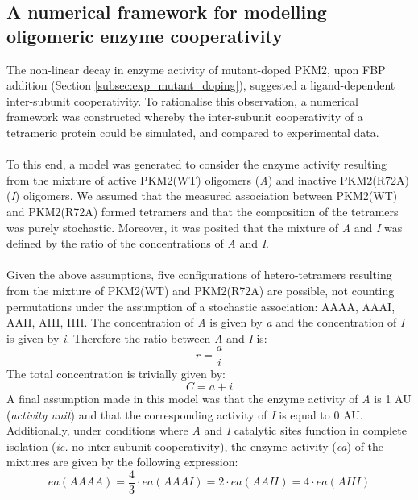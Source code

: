 \subsection{A numerical framework for modelling oligomeric enzyme cooperativity}
The non-linear decay in enzyme activity of mutant-doped PKM2, upon FBP addition (Section \ref{subsec:exp_mutant_doping}), suggested a ligand-dependent inter-subunit cooperativity. To rationalise this observation, a numerical framework was constructed whereby the inter-subunit cooperativity of a tetrameric protein could be simulated, and compared to experimental data.
%
%
\\\\
%
%
To this end, a model was generated to consider the enzyme activity resulting from the mixture of active PKM2(WT) oligomers (\textit{A}) and inactive PKM2(R72A) (\textit{I}) oligomers. We assumed that the measured association between PKM2(WT) and PKM2(R72A) formed tetramers and that the composition of the tetramers was purely stochastic. Moreover, it was posited that the mixture of \textit{A} and \textit{I} was defined by the ratio of the concentrations of \textit{A} and \textit{I}. 
%
%
\\\\
%
%
Given the above assumptions, five configurations of hetero-tetramers resulting from the mixture of PKM2(WT) and PKM2(R72A) are possible, not counting permutations under the assumption of a stochastic association: AAAA, AAAI, AAII, AIII, IIII. The concentration of \textit{A} is given by \textit{a} and the concentration of \textit{I} is given by \textit{i}. Therefore the ratio between \textit{A} and \textit{I} is:
%
\begin{equation}
r = \frac{a}{i}
\end{equation}
%
The total concentration is trivially given by:
%
\begin{equation}
C = a + i
\end{equation}
%
%
A final assumption made in this model was that the enzyme activity of \textit{A} is 1 AU (\textit{activity unit}) and that the corresponding activity of \textit{I} is equal to 0 AU. Additionally, under conditions where \textit{A} and \textit{I} catalytic sites function in complete isolation (\textit{ie.} no inter-subunit cooperativity), the enzyme activity (\textit{ea}) of the mixtures are given by the following expression:
%
%
\begin{equation}
ea(AAAA) = \frac{4}{3} \cdot ea(AAAI) = 2 \cdot ea(AAII) =4 \cdot ea(AIII)
\end{equation}

